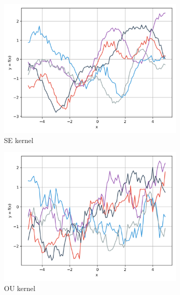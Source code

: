 \documentclass{article}
\begin{document}
\begin{figure}[ht]
  \begin{subfigure}{.245\textwidth}
    \centering
    \includegraphics[width=\linewidth]{kernels/prior/noisy/kernelSE.png}
    \caption{SE kernel}
    \label{fig:priorSE}
  \end{subfigure}
  \begin{subfigure}{.245\textwidth}
    \centering
    \includegraphics[width=\linewidth]{kernels/prior/noisy/kernelOU.png}
    \caption{OU kernel}
    \label{fig:priorOU}
  \end{subfigure}
  \begin{subfigure}{.245\textwidth}
    \centering

\end{subfigure}
\end{figure}
\end{document}
